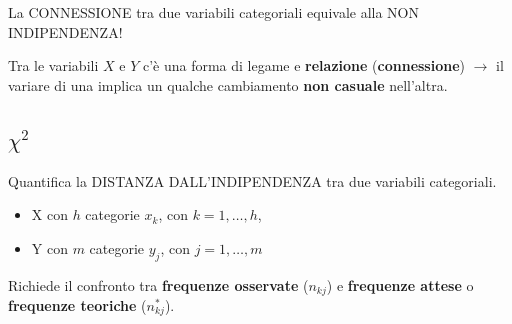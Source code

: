 \documentclass[
  a4paper,
  DIV=11,
  numbers=noendperiod]{scrreprt}
\providecommand{\tightlist}{%
  \setlength{\itemsep}{0pt}\setlength{\parskip}{0pt}}
\begin{document}
\begin{center}
La CONNESSIONE tra due variabili categoriali equivale alla NON INDIPENDENZA!
        
\end{center}

Tra le variabili \(X\) e \(Y\) c'è una forma di legame e
\textbf{relazione} (\textbf{connessione}) \(\rightarrow\) il variare di
una implica un qualche cambiamento \textbf{non casuale} nell'altra.

\subsection{\texorpdfstring{\(\chi^2\)}{\textbackslash chi\^{}2}}\label{chi2}

Quantifica la DISTANZA DALL'INDIPENDENZA tra due variabili categoriali.

\begin{itemize}
\tightlist
\item
  X con \(h\) categorie \(x_k\), con \(k=1,\ldots,h\),
\item
  Y con \(m\) categorie \(y_j\), con \(j=1,\ldots,m\)
\end{itemize}

Richiede il confronto tra \textbf{frequenze osservate} (\(n_{kj}\)) e
\textbf{frequenze attese} o \textbf{frequenze teoriche} (\(n_{kj}^*\)).

\end{document}
